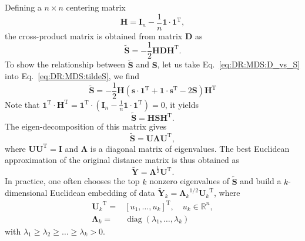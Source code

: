 Defining a $n\times n$ centering matrix
\begin{equation}
	\mathbf{H}=\mathbf{I}_n- \frac{1}{n}\mathbf{1}\cdot\mathbf{1}^{\operatorname{T}},
\end{equation}
the cross-product matrix is obtained from matrix $\mathbf{D}$ as
\begin{equation}
	\tilde{\mathbf{S}}=-\frac{1}{2}\mathbf{HD}\mathbf{H}^{\operatorname{T}}.
	\label{eq:DR:MDS:tildeS}
\end{equation}
To show the relationship between $\tilde{\mathbf{S}}$ and $\mathbf{S}$, let us take Eq.~\ref{eq:DR:MDS:D_vs_S} into Eq.~\ref{eq:DR:MDS:tildeS}, we find
\begin{equation}
	\tilde{\mathbf{S}}=-\frac{1}{2}\mathbf{H}\left(\mathbf{s}\cdot\mathbf{1}^{\operatorname{T}}+\mathbf{1}\cdot\mathbf{s}^{\operatorname{T}}-2\mathbf{S}\right)\mathbf{H}^{\operatorname{T}}
\end{equation}
Note that $\mathbf{1}^{\operatorname{T}}\cdot \mathbf{H}^{\operatorname{T}}=\mathbf{1}^{\operatorname{T}}\cdot\left(\mathbf{I}_n- \frac{1}{n}\mathbf{1}\cdot\mathbf{1}^{\operatorname{T}}\right)=0$, it yields
\begin{equation}
	\tilde{\mathbf{S}}=\mathbf{HS}\mathbf{H}^{\operatorname{T}}.
\end{equation}
The eigen-decomposition of this matrix gives
\begin{equation}
	\tilde{\mathbf{S}}=\mathbf{U\Lambda}\mathbf{U}^{\operatorname{T}},
\end{equation}
where $\mathbf{U}\mathbf{U}^{\operatorname{T}}=\mathbf{I}$ and $\mathbf{\Lambda}$ is a diagonal matrix of eigenvalues. The best Euclidean approximation of the original distance matrix is thus obtained as
\begin{equation}
	\tilde{\mathbf{Y}}=\mathbf{\Lambda}^{\operatorname{\frac{1}{2}}}\mathbf{U}^{\operatorname{T}}.
\end{equation}
In practice, one often chooses the top $k$ nonzero eigenvalues of $\tilde{\mathbf{S}}$ and build a $k$-dimensional Euclidean embedding of data $\tilde{\mathbf{Y}}_k={\mathbf{\Lambda}_k}^{1/2}{\mathbf{U}_k}^{\operatorname{T}}$, where
\begin{align*}
	{\mathbf{U}_k}^{\operatorname{T}}=&\left[u_1, \dots, u_k\right]^{\operatorname{T}},\quad u_k\in \mathbb{R}^n,\\
	\mathbf{\Lambda}_k=&\operatorname{diag}(\lambda_1,\dots,\lambda_k)
\end{align*}
with $\lambda_1\ge \lambda_2\ge \dots \ge \lambda_k>0$.